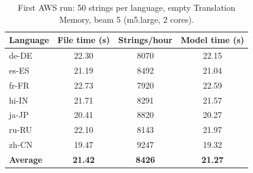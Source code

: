 \begin{table}[H]
\centering
\caption[First AWS run]{First AWS run: 50 strings per language, empty Translation Memory, beam 5 (m5.large, 2 cores).}
\label{tab:awsbaseline}
\begin{tabular}{@{}l S[table-format=2.2] S[table-format=4.0] S[table-format=2.2]@{}}
\toprule
\textbf{Language} & {\textbf{File time (s)}} & {\textbf{Strings/hour}} & {\textbf{Model time (s)}} \\
\midrule
de-DE & 22.30 & 8070 & 22.15 \\
es-ES & 21.19 & 8492 & 21.04 \\
fr-FR & 22.73 & 7920 & 22.59 \\
hi-IN & 21.71 & 8291 & 21.57 \\
ja-JP & 20.41 & 8820 & 20.27 \\
ru-RU & 22.10 & 8143 & 21.97 \\
zh-CN & 19.47 & 9247 & 19.32 \\
\midrule
\textbf{Average} & \bfseries 21.42 & \bfseries 8426 & \bfseries 21.27 \\
\bottomrule
\end{tabular}
\end{table}
